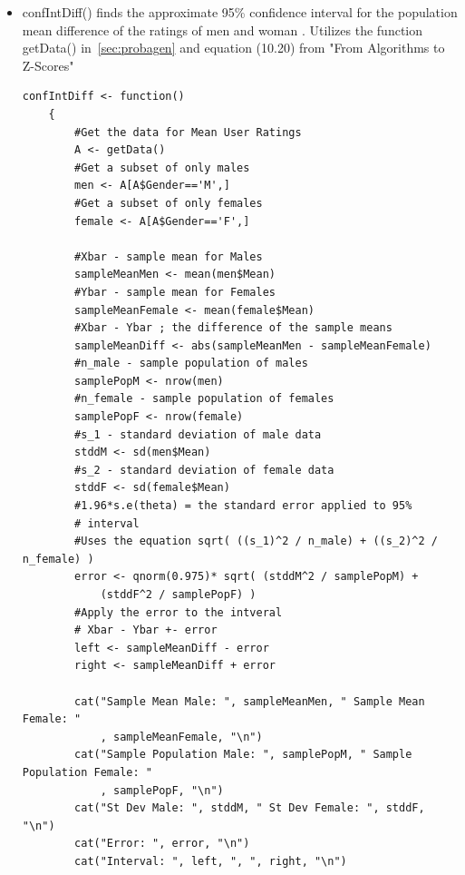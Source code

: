 \documentclass[11pt]{article}  %
\begin{document}
\begin{itemize}
\begin{lstlisting}[basicstyle=\small]
    	#Find the left and right ends of the interval
    	# Xbar -+ error
    	left <- sampleMean - error
    	right <- sampleMean + error
    
    	cat("Sample Mean: ", sampleMean, "\n")
    	cat("Sample Population: ", samplePop, "\n")
    	cat("St Dev: ", stdd, " Error: ", error, "\n")
    	cat("Interval: ", left, ", ", right, "\n")
    
    	return(1)
    }
    \end{lstlisting}

    \label{sec:CID}
    \item confIntDiff() finds the approximate 95\% confidence interval for the population mean difference of the ratings of men and woman . Utilizes the function getData() in~\ref{sec:probagen} and equation (10.20) from "From Algorithms to Z-Scores"
    \begin{lstlisting}[basicstyle=\small]
    confIntDiff <- function()
    {
    	#Get the data for Mean User Ratings
    	A <- getData()
    	#Get a subset of only males
    	men <- A[A$Gender=='M',]
    	#Get a subset of only females
    	female <- A[A$Gender=='F',]
    
    	#Xbar - sample mean for Males
    	sampleMeanMen <- mean(men$Mean)
    	#Ybar - sample mean for Females
    	sampleMeanFemale <- mean(female$Mean)
    	#Xbar - Ybar ; the difference of the sample means
    	sampleMeanDiff <- abs(sampleMeanMen - sampleMeanFemale)
    	#n_male - sample population of males
    	samplePopM <- nrow(men)
    	#n_female - sample population of females
    	samplePopF <- nrow(female)
    	#s_1 - standard deviation of male data
    	stddM <- sd(men$Mean)
    	#s_2 - standard deviation of female data
    	stddF <- sd(female$Mean)
    	#1.96*s.e(theta) = the standard error applied to 95%
    	# interval
    	#Uses the equation sqrt( ((s_1)^2 / n_male) + ((s_2)^2 / n_female) ) 
    	error <- qnorm(0.975)* sqrt( (stddM^2 / samplePopM) + 
    	    (stddF^2 / samplePopF) )
    	#Apply the error to the intveral
    	# Xbar - Ybar +- error
    	left <- sampleMeanDiff - error
    	right <- sampleMeanDiff + error
    
    	cat("Sample Mean Male: ", sampleMeanMen, " Sample Mean Female: "
    	    , sampleMeanFemale, "\n")
    	cat("Sample Population Male: ", samplePopM, " Sample Population Female: "
    	    , samplePopF, "\n")
    	cat("St Dev Male: ", stddM, " St Dev Female: ", stddF, "\n")
    	cat("Error: ", error, "\n")
    	cat("Interval: ", left, ", ", right, "\n")
    	

\end{lstlisting}
\end{itemize}
\end{document}
